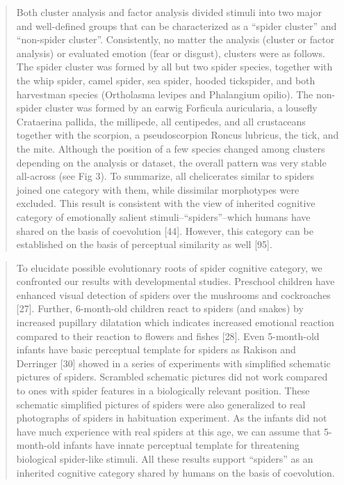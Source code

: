 \documentclass[
]{book}
\begin{document}
\begin{quote}
Both cluster analysis and factor analysis divided stimuli into two major and well-defined groups that can be characterized as a ``spider cluster'' and ``non-spider cluster''. Consistently, no matter the analysis (cluster or factor analysis) or evaluated emotion (fear or disgust), clusters were as follows. The spider cluster was formed by all but two spider species, together with the whip spider, camel spider, sea spider, hooded tickspider, and both harvestman species (Ortholasma levipes and Phalangium opilio). The non-spider cluster was formed by an earwig Forficula auricularia, a lousefly Crataerina pallida, the millipede, all centipedes, and all crustaceans together with the scorpion, a pseudoscorpion Roncus lubricus, the tick, and the mite. Although the position of a few species changed among clusters depending on the analysis or dataset, the overall pattern was very stable all-across (see Fig 3). To summarize, all chelicerates similar to spiders joined one category with them, while dissimilar morphotypes were excluded. This result is consistent with the view of inherited cognitive category of emotionally salient stimuli--``spiders''--which humans have shared on the basis of coevolution {[}44{]}. However, this category can be established on the basis of perceptual similarity as well {[}95{]}.
\end{quote}

\begin{quote}
To elucidate possible evolutionary roots of spider cognitive category, we confronted our results with developmental studies. Preschool children have enhanced visual detection of spiders over the mushrooms and cockroaches {[}27{]}. Further, 6-month-old children react to spiders (and snakes) by increased pupillary dilatation which indicates increased emotional reaction compared to their reaction to flowers and fishes {[}28{]}. Even 5-month-old infants have basic perceptual template for spiders as Rakison and Derringer {[}30{]} showed in a series of experiments with simplified schematic pictures of spiders. Scrambled schematic pictures did not work compared to ones with spider features in a biologically relevant position. These schematic simplified pictures of spiders were also generalized to real photographs of spiders in habituation experiment. As the infants did not have much experience with real spiders at this age, we can assume that 5-month-old infants have innate perceptual template for threatening biological spider-like stimuli. All these results support ``spiders'' as an inherited cognitive category shared by humans on the basis of coevolution.
\end{quote}
\end{document}
